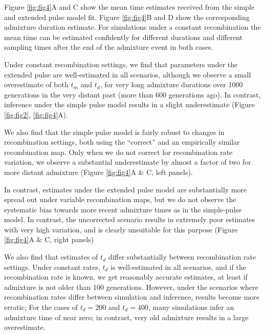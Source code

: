 \documentclass[11pt]{article}
\begin{document}
Figure \ref{fig:fig4}A and C show the mean
time estimates received from the simple and extended pulse model fit. Figure \ref{fig:fig4}B and D show the corresponding admixture duration estimate. For simulations under a
constant recombination the mean time can be estimated confidently for different durations and different sampling times after the end of the admixture event in both cases. 

Under constant recombination settings, we find that parameters under the extended pulse are well-estimated in all scenarios, although we observe a small overestimate of both $t_m$ and $t_d$, for very long admixture durations over 1000 generations in the very distant past (more than 600 generations ago). In contrast, inference under the simple pulse model results in a slight underestimate (Figure \ref{fig:fig2}, \ref{fig:fig4}A).

We also find that the simple pulse model is fairly robust to changes in recombination settings, both using the ``correct'' and an empirically similar recombination map. Only when we do not correct for recombination rate variation, we observe a substantial underestimate by almost a factor of two for more distant admixture (Figure \ref{fig:fig4}A \& C, left panels). 

In contrast, estimates under the extended pulse model are substantially more spread out under variable recombination maps, but we do not observe the systematic bias towards more recent admixture times as in the simple-pulse model. In contrast, the uncorrected scenario results in extremely poor estimates with very high variation, and is clearly unsuitable for this purpose (Figure \ref{fig:fig4}A \& C, right panels)

We also find that estimates of $t_d$ differ substantially between recombination rate settings. Under constant rates, $t_d$ is well-estimated in all scenarios, and if the recombination rate is known, we get reasonably accurate estimates, at least if admixture is not older than 100 generations. However, under the scenarios where recombination rates differ between simulation and inference, results become more erratic; For the cases of $t_d=200$ and $t_d=400$, many simulations infer an admixture time of near zero; in contrast, very old admixture results in a large overestimate.
\end{document}
